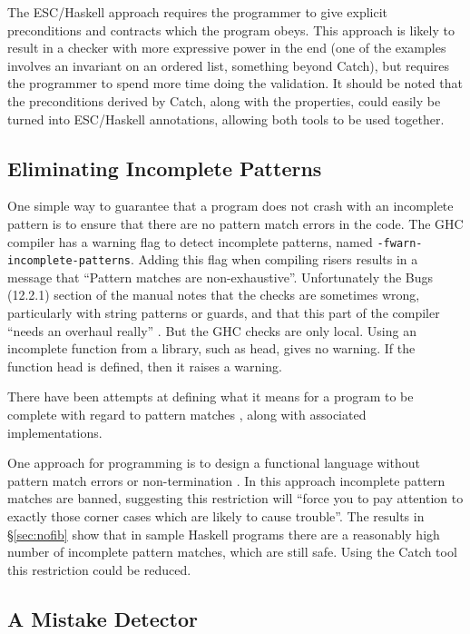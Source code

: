 \documentclass[preprint]{sigplanconf}
\newcommand{\T}[1]{\texttt{#1}}
\newcommand{\C}[1]{\textsf{#1}}
\begin{document}
The ESC/Haskell approach requires the programmer to give explicit preconditions and contracts which the program obeys. This approach is likely to result in a checker with more expressive power in the end (one of the examples involves an invariant on an ordered list, something beyond Catch), but requires the programmer to spend more time doing the validation. It should be noted that the preconditions derived by Catch, along with the properties, could easily be turned into ESC/Haskell annotations, allowing both tools to be used together.

\subsection{Eliminating Incomplete Patterns}

One simple way to guarantee that a program does not crash with an incomplete pattern is to ensure that there are no pattern match errors in the code. The GHC compiler  \citep{ghc} has a warning flag to detect incomplete patterns, named \T{-fwarn-incomplete-patterns}. Adding this flag when compiling risers results in a message that ``Pattern matches are non-exhaustive''. Unfortunately the Bugs (12.2.1) section of the manual notes that the checks are sometimes wrong, particularly with string patterns or guards, and that this part of the compiler ``needs an overhaul really'' \citep{ghc_manual}. But the GHC checks are only local. Using an incomplete function from a library, such as \C{head}, gives no warning. If the function \C{head} is defined, then it raises a warning.

There have been attempts at defining what it means for a program to be complete with regard to pattern matches \citep{maranget:pattern_warnings}, along with associated implementations.

One approach for programming is to design a functional language without pattern match errors or non-termination \cite{turner:total}. In this approach incomplete pattern matches are banned, suggesting this restriction will ``force you to pay attention to exactly those corner cases which are likely to cause trouble''. The results in \S\ref{sec:nofib} show that in sample Haskell programs there are a reasonably high number of incomplete pattern matches, which are still safe. Using the Catch tool this restriction could be reduced.

\subsection{A Mistake Detector}
\end{document}
